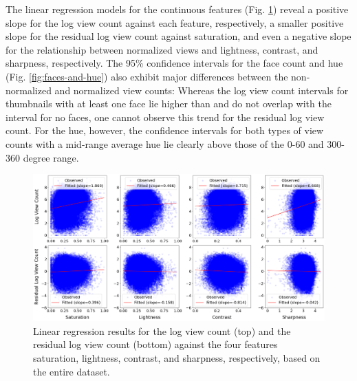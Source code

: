 \documentclass{article}
\begin{document}
The linear regression models for the continuous features (Fig. \ref{fig:lr}) reveal a positive slope for the log view count against each feature, respectively, a smaller positive slope for the residual log view count against saturation, and even a negative slope for the relationship between normalized views and lightness, contrast, and sharpness, respectively. The 95\% confidence intervals for the face count and hue (Fig. \ref{fig:faces-and-hue}) also exhibit major differences between the non-normalized and normalized view counts: Whereas the log view count intervals for thumbnails with at least one face lie higher than and do not overlap with the interval for no faces, one cannot observe this trend for the residual log view count. For the hue, however, the confidence intervals for both types of view counts with a mid-range average hue lie clearly above those of the 0-60 and 300-360 degree range.
\begin{figure}[h]
  \centering
  \includegraphics[width=\textwidth]{figs/lr.png}
  \caption{Linear regression results for the log view count (top) and the residual log view count (bottom) against the four features saturation, lightness, contrast, and sharpness, respectively, based on the entire dataset.}
  \label{fig:lr}
\end{figure}
\end{document}
